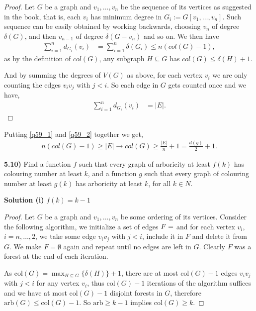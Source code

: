 \documentclass[11pt]{article}
\theoremstyle{plain}
\begin{document}
\begin{proof}
Let $G$ be a graph and $v_1,\ldots,v_n$ be the sequence of its vertices as suggested in the book, that is, each $v_i$ has minimum degree in $G_i := G[v_1,\ldots,v_n]$. Such sequence can be easily obtained by working backwards, choosing $v_n$ of degree $\delta(G)$, and then $v_{n-1}$ of degree $\delta(G-v_n)$ and so on. We then have
\begin{align} \label{q59_1}
\sum_{i=1}^n d_{G_i}(v_i) & = \sum_{i=1}^n \delta (G_i) \leq n (col(G)-1),
\end{align} 
as by the definition of $col(G)$, any subgraph $H \subseteq G$ has $col(G) \leq \delta(H) + 1$.

And by summing the degrees of $V(G)$ as above, for each vertex $v_i$ we are only counting the edges $v_iv_j$ with $j<i$. So each edge in $G$ gets counted once and we have,
\begin{align} \label{q59_2}
\sum_{i=1}^n d_{G_i}(v_i) & = |E|.
\end{align}
\end{proof}

Putting \eqref{q59_1} and \eqref{q59_2} together we get,
\begin{align*}
 n (col(G)-1) \geq |E| \rightarrow col(G) \geq \frac{|E|}{n} + 1 = \frac{d(g)}{2} + 1.
\end{align*}


\textbf{5.10)} Find a function $f$ such that every graph of arboricity at least $f(k)$ has colouring number at least $k$, and a function $g$ such that every graph of colouring number at least $g(k)$ has arboricity at least $k$, for all $k \in N$.

\noindent \textbf{Solution (i)} $f(k) = k-1$

\begin{proof}
Let $G$ be a graph and $v_1,\ldots,v_n$ be some ordering of its vertices. Consider the following algorithm, we initialize a set of edges $F=\empty$ and for each vertex $v_i$, $i=n,\ldots,2$, we take some edge $v_iv_j$ with $j < i$, include it in $F$ and delete it from $G$. We make $F=\emptyset$ again and repeat until no edges are left in $G$. Clearly $F$ was a forest at the end of each iteration.

As $\text{col}(G) = \max_{H\subseteq G}\{\delta(H)\} + 1$, there are at most $\text{col}(G) - 1$ edges $v_iv_j$ with $j<i$ for any vertex $v_i$, thus $\text{col}(G) - 1$ iterations of the algorithm suffices and we have at most $\text{col}(G) - 1$ disjoint forests in $G$, therefore $\text{arb}(G) \leq \text{col}(G) - 1$. So $\text{arb} \geq k-1$ implies $\text{col}(G) \geq k$.
\end{proof}
\end{document}
